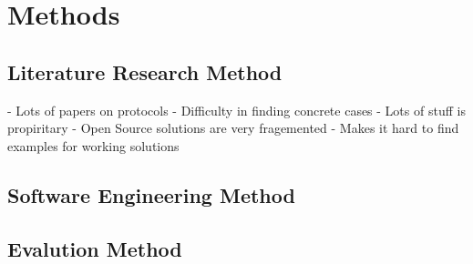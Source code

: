 \chapter{\label{methods}Methods}
\thispagestyle{fancy}

\section{Literature Research Method}



- Lots of papers on protocols
- Difficulty in finding concrete cases
- Lots of stuff is propiritary
  - Open Source solutions are very fragemented
  - Makes it hard to find examples for working solutions

\section{Software Engineering Method}

\section{Evalution Method}

